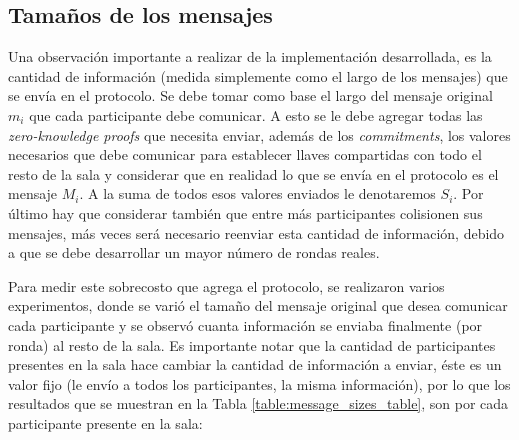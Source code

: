 \subsection{Tamaños de los mensajes}

Una observación importante a realizar de la implementación desarrollada, es la 
cantidad de información (medida simplemente como el largo de los mensajes) que 
se envía en el protocolo. Se debe tomar como base el largo del mensaje 
original $m_i$ que cada participante debe comunicar. A esto se le debe agregar 
todas las \emph{zero-knowledge proofs} que necesita enviar, además de los 
\emph{commitments}, los valores necesarios que debe comunicar para establecer 
llaves compartidas con todo el resto de la sala y considerar que en realidad 
lo que se envía en el protocolo es el mensaje $M_i$. A la suma de todos esos 
valores enviados le denotaremos $S_i$. Por último hay que considerar también 
que entre más participantes colisionen sus mensajes, más veces será necesario 
reenviar esta cantidad de información, debido a que se debe desarrollar un 
mayor número de rondas reales.

Para medir este sobrecosto que agrega el protocolo, se realizaron varios 
experimentos, donde se varió el tamaño del mensaje original que desea 
comunicar cada participante y se observó cuanta información se enviaba 
finalmente (por ronda) al resto de la sala. Es importante notar que la 
cantidad de participantes presentes en la sala hace cambiar la cantidad de 
información a enviar, éste es un valor fijo (le envío a todos los 
participantes, la misma información), por lo que los resultados que se 
muestran en la Tabla \ref{table:message_sizes_table}, son por cada 
participante presente en la sala:


